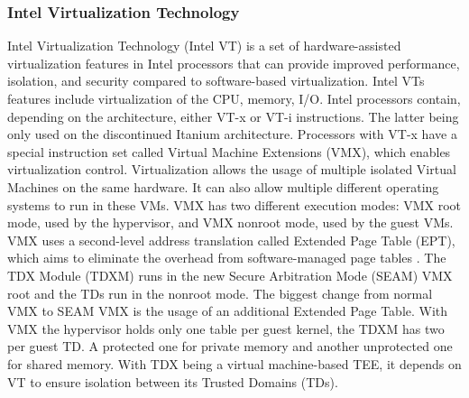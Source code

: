 \subsubsection{Intel Virtualization Technology}
Intel Virtualization Technology (Intel VT) is a set of hardware-assisted virtualization features in Intel processors that can provide improved performance, isolation, and security compared to software-based virtualization. Intel VTs features include virtualization of the CPU, memory, I/O.
Intel processors contain, depending on the architecture, either VT-x or VT-i instructions. The latter being only used on the discontinued Itanium architecture. Processors with VT-x have a special instruction set called Virtual Machine Extensions (VMX), which enables virtualization control. Virtualization allows the usage of multiple isolated Virtual Machines on the same hardware. It can also allow multiple different operating systems to run in these VMs\cite{intel_corporation_intel_nodate}. VMX has two different execution modes: VMX root mode, used by the hypervisor, and VMX nonroot mode, used by the guest VMs. VMX uses a second-level address translation called Extended Page Table (EPT), which aims to eliminate the overhead from software-managed page tables \cite{uhlig_intel_2005}. The TDX Module (TDXM) runs in the new Secure Arbitration Mode (SEAM) VMX root and the TDs run in the nonroot mode. The biggest change from normal VMX to SEAM VMX is the usage of an additional Extended Page Table. With VMX the hypervisor holds only one table per guest kernel, the TDXM has two per guest TD. A protected one for private memory and another unprotected one for shared memory.
With TDX being a virtual machine-based TEE, it depends on VT to ensure isolation between its Trusted Domains (TDs)\cite{cheng_intel_2023}.

